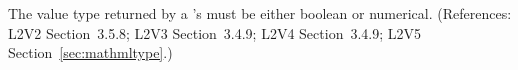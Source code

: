 The value type returned by a \FunctionDefinition's  must be
either boolean or numerical.  (References: L2V2 Section~3.5.8;
L2V3 Section~3.4.9; L2V4 Section~3.4.9; L2V5 Section~\ref{sec:mathmltype}.)
